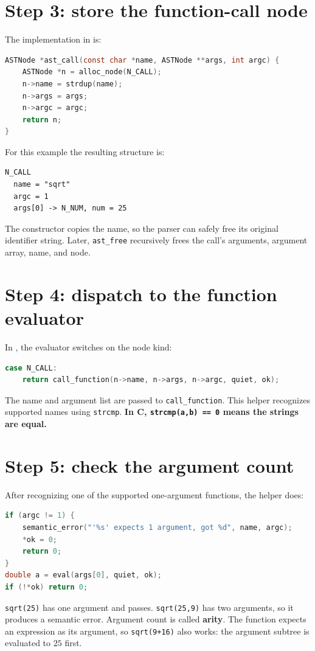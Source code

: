 \documentclass[11pt,a4paper]{report}
\newcommand{\file}[1]{\texttt{\detokenize{#1}}}
\begin{document}
\section{Step 3: store the function-call node}
The implementation in \file{src/ast.c} is:
\begin{lstlisting}[language=C]
ASTNode *ast_call(const char *name, ASTNode **args, int argc) {
    ASTNode *n = alloc_node(N_CALL);
    n->name = strdup(name);
    n->args = args;
    n->argc = argc;
    return n;
}
\end{lstlisting}
For this example the resulting structure is:
\begin{lstlisting}
N_CALL
  name = "sqrt"
  argc = 1
  args[0] -> N_NUM, num = 25
\end{lstlisting}
The constructor copies the name, so the parser can safely free its original
identifier string. Later, \texttt{ast\_free} recursively frees the call's
arguments, argument array, name, and node.

\section{Step 4: dispatch to the function evaluator}
In \file{src/eval.c}, the evaluator switches on the node kind:
\begin{lstlisting}[language=C]
case N_CALL:
    return call_function(n->name, n->args, n->argc, quiet, ok);
\end{lstlisting}
The name and argument list are passed to \texttt{call\_function}.
This helper recognizes supported names using \texttt{strcmp}.
\textbf{In C, \texttt{strcmp(a,b) == 0} means the strings are equal.}

\section{Step 5: check the argument count}
After recognizing one of the supported one-argument functions, the helper does:
\begin{lstlisting}[language=C]
if (argc != 1) {
    semantic_error("'%s' expects 1 argument, got %d", name, argc);
    *ok = 0;
    return 0;
}
double a = eval(args[0], quiet, ok);
if (!*ok) return 0;
\end{lstlisting}
\texttt{sqrt(25)} has one argument and passes. \texttt{sqrt(25,9)} has two
arguments, so it produces a semantic error. Argument count is called
\textbf{arity}. The function expects an expression as its argument, so
\texttt{sqrt(9+16)} also works: the argument subtree is evaluated to $25$ first.
\end{document}

